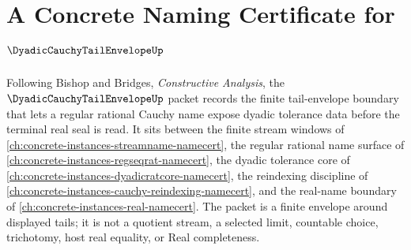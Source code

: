 \chapter{A Concrete Naming Certificate for $\DyadicCauchyTailEnvelopeUp$}
\label{ch:concrete-instances-dyadic-cauchy-tail-envelope-namecert}

Following Bishop and Bridges, \emph{Constructive Analysis}, the $\DyadicCauchyTailEnvelopeUp$ packet records the finite tail-envelope boundary that lets a regular rational Cauchy name expose dyadic tolerance data before the terminal real seal is read. It sits between the finite stream windows of \autoref{ch:concrete-instances-streamname-namecert}, the regular rational name surface of \autoref{ch:concrete-instances-regseqrat-namecert}, the dyadic tolerance core of \autoref{ch:concrete-instances-dyadicratcore-namecert}, the reindexing discipline of \autoref{ch:concrete-instances-cauchy-reindexing-namecert}, and the real-name boundary of \autoref{ch:concrete-instances-real-namecert}. The packet is a finite envelope around displayed tails; it is not a quotient stream, a selected limit, countable choice, trichotomy, host real equality, or Real completeness.

